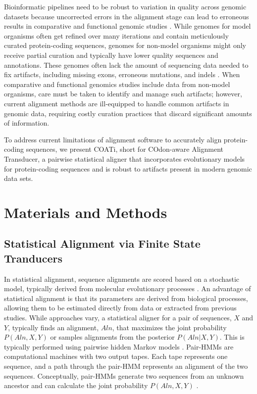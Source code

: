 \documentclass[12pt,letterpaper]{article}
\begin{document}
Bioinformatic pipelines need to be robust to variation in quality across genomic datasets because uncorrected errors in the alignment stage can lead to erroneous results in comparative and functional genomic studies \citep{estimates_schneider_2009, effect_fletcher_2010, hubisz2011error}.
While genomes for model organisms often get refined over many iterations and contain meticulously curated protein-coding sequences, 
genomes for non-model organisms might only receive partial curation and typically have lower quality sequences and annotations.
These genomes often lack the amount of sequencing data needed to fix artifacts, including missing exons, erroneous mutations, and indels \citep{jackman2018tigmint}.
%
When comparative and functional genomics studies include data from non-model organisms, care must be taken to identify and manage such artifacts; however,
current alignment methods are ill-equipped to handle common artifacts in genomic data, requiring costly curation practices that discard significant amounts of information.

To address current limitations of alignment software to accurately align protein-coding sequences, we present COATi, short for COdon-aware Alignment Transducer, a pairwise statistical aligner that incorporates evolutionary models for protein-coding sequences and is robust to artifacts present in modern genomic data sets.


\section*{Materials and Methods}

\subsection*{Statistical Alignment via Finite State Tranducers}

In statistical alignment, sequence alignments are scored based on a stochastic model, typically derived from molecular evolutionary processes \citep{Lunter2005-hk}. An advantage of statistical alignment is that its parameters are derived from biological processes, allowing them to be estimated directly from data or extracted from previous studies. While approaches vary, a statistical aligner for a pair of sequences, $X$ and $Y$, typically finds an alignment, $Aln$, that maximizes the joint probability $P(Aln, X, Y)$ or samples alignments from the posterior $P(Aln | X, Y)$. This is typically performed using pairwise hidden Markov models \citep[pair-HMMs;][]{bradley2007transducers}. Pair-HMMs are computational machines with two output tapes. Each tape represents one sequence, and a path through the pair-HMM represents an alignment of the two sequences. Conceptually, pair-HMMs generate two sequences from an unknown ancestor and can calculate the joint probability $P(Aln, X, Y)$ \citep{yoon_2009_hmm}.
\end{document}
